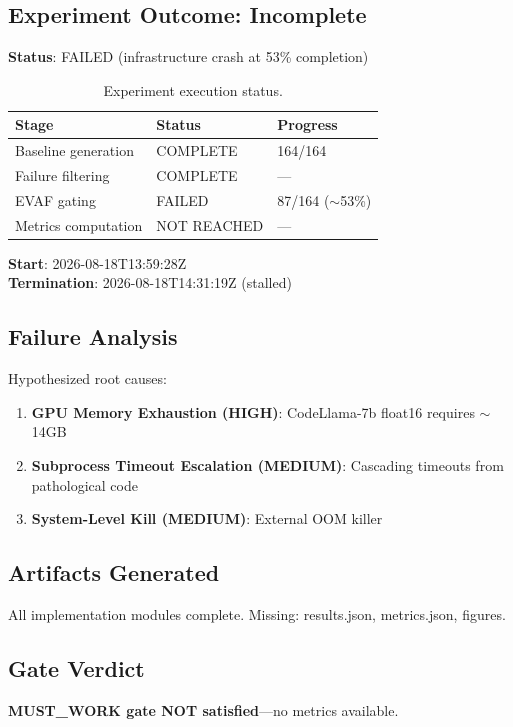 
\subsection{Experiment Outcome: Incomplete}

\textbf{Status}: FAILED (infrastructure crash at 53\% completion)

\begin{table}[h]
\centering
\begin{tabular}{lll}
\toprule
Stage & Status & Progress \\
\midrule
Baseline generation & COMPLETE & 164/164 \\
Failure filtering & COMPLETE & --- \\
EVAF gating & FAILED & 87/164 ($\sim$53\%) \\
Metrics computation & NOT REACHED & --- \\
\bottomrule
\end{tabular}
\caption{Experiment execution status.}
\end{table}

\textbf{Start}: 2026-08-18T13:59:28Z\\
\textbf{Termination}: 2026-08-18T14:31:19Z (stalled)

\subsection{Failure Analysis}

Hypothesized root causes:
\begin{enumerate}
    \item \textbf{GPU Memory Exhaustion (HIGH)}: CodeLlama-7b float16 requires $\sim$14GB
    \item \textbf{Subprocess Timeout Escalation (MEDIUM)}: Cascading timeouts from pathological code
    \item \textbf{System-Level Kill (MEDIUM)}: External OOM killer
\end{enumerate}

\subsection{Artifacts Generated}

All implementation modules complete. Missing: results.json, metrics.json, figures.

\subsection{Gate Verdict}

\textbf{MUST\_WORK gate NOT satisfied}---no metrics available.
